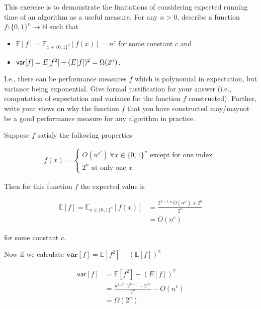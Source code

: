 \documentclass[12pt, a4paper, onecolumn]{exam}
\begin{document}
\begin{questions}

	\question[10]  This exercise is to demonstrate the limitations of considering expected running time of an algorithm as a useful measure. For any $n>0$, describe  a function $f:\{0,1\}^n \to \mathbb{N}$ such that
	\begin{itemize}
		\item $\mathbb{E}[f] = \mathbb{E}_{x\in \{0,1\}^n}[f(x)] = n^c$ for some constant $c$ and
		\item ${\sf var}[f] = E[f^2] - (E[f])^2 = \Omega(2^n)$.
	\end{itemize}
	I.e., there can be performance measures $f$ which is polynomial in expectation, but variance being exponential. Give formal justification for your answer (i.e., computation of expectation and variance for the function $f$ constructed).  Further, write your views on why the function $f$ that you have constructed may/maynot be a good performance measure for any algorithm in practice.

	\begin{solution}
		Suppose $f$ satisfy the following properties

		\begin{align*}
			f(x) =
			\begin{cases}
				O(n^{c'}) \: \forall x \in \{0, 1\}^n \text{ except for one index }\\
				2^n \text{ at only one } x
			\end{cases}
		\end{align*}
		
		Then for this function $f$ the expected value is

		\begin{align*}
			\mathbb{E}[f] = \mathbb{E}_{x \in \{0, 1\}^n}[f(x)] &= \frac{2^{n - 1} * O(n^{c'}) + 2^n}{2^n}\\
			&= O(n^c)
		\end{align*}

		for some constant $c$.

		Now if we calculate $\textbf{var}[f] = \mathbb{E}[f^2] - (\mathbb{E}[f])^2$

		\begin{align*}
			\textsf{var}[f] &= \mathbb{E}[f^2] - (E[f])^2\\
			&= \frac{n^{2 \cdot c'} \cdot 2^{n - 1} + 2^{2n}}{2^n} - O(n^c)\\
			&= \Omega(2^n)
		\end{align*}


\end{solution}
\end{questions}
\end{document}
